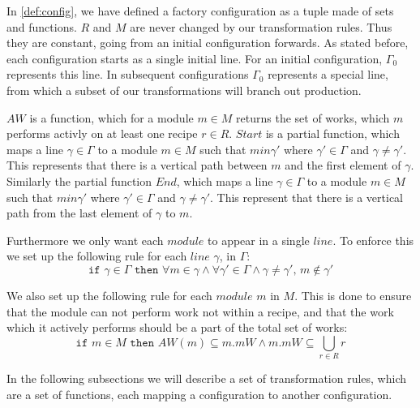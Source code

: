 In \cref{def:config}, we have defined a factory configuration as a tuple made of sets and functions. $R$ and $M$ are never changed by our transformation rules. Thus they are constant, going from an initial configuration forwards. As stated before, each configuration starts as a single initial line. For an initial configuration, $\Gamma_0$ represents this line. In subsequent configurations $\Gamma_0$ represents a special line, from which a subset of our transformations will branch out production.

$AW$ is a function, which for a module $m \in M$ returns the set of works, which $m$ performs activly on at least one recipe $r \in R$. $Start$ is a partial function, which maps a line $\gamma \in \Gamma$ to a module $m \in M$ such that $m in \gamma'$ where $\gamma' \in \Gamma$ and $\gamma \neq \gamma'$. This represents that there is a vertical path between $m$ and the first element of $\gamma$. Similarly the partial function $End$, which maps a line $\gamma \in \Gamma$ to a module $m \in M$ such that $m in \gamma'$ where $\gamma' \in \Gamma$ and $\gamma \neq \gamma'$. This represent that there is a vertical path from the last element of $\gamma$ to $m$.   

Furthermore we only want each $module$ to appear in a single $line$. To enforce this we set up the following rule for each $line$ $\gamma$, in $\Gamma$:
\[\texttt{if } \gamma \in \Gamma \texttt{ then } \forall m \in \gamma \land \forall \gamma ' \in \Gamma \land \gamma \neq \gamma ',\, m \notin \gamma ' \]

We also set up the following rule for each $module$ $m$ in $M$. This is done to ensure that the module can not perform work not within a recipe, and that the work which it actively performs should be a part of the total set of works:
\[\texttt{if } m \in M \texttt{ then } AW(m) \subseteq m.mW \land m.mW \subseteq  \bigcup_{r\in R}r\] 

In the following subsections we will describe a set of transformation rules, which are a set of functions, each mapping a configuration to another configuration.

 
 
 
 










